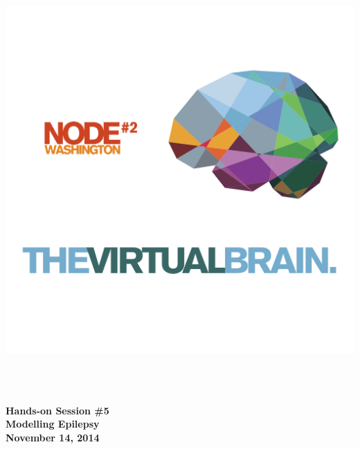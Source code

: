 \thispagestyle{plain}
\begin{titlepage}
\begin{center}
\includegraphics[width=1.5\textwidth]{./tvb_logo_transparent_square.png}~\\[0.5cm]

\begin{fullwidth}
\HRule \\[0.2cm]
\begin{center}
{ \huge \bfseries Hands-on Session \#5 \\ [0.2cm] Modelling Epilepsy \\[0.1cm] }
{ \large \bfseries November 14, 2014 \\[0.2cm]}
\end{center}
\HRule \\[0.2cm]
\end{fullwidth}

\end{center}
\end{titlepage}
